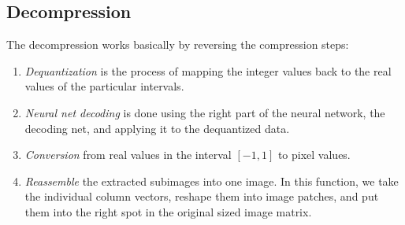 \subsection{Decompression} \label{sec:decompression}
The decompression works basically by reversing the compression steps:
\begin{enumerate}
\item \emph{Dequantization} is the process of mapping the integer values back to the real values of the particular intervals. 

\item \emph{Neural net decoding} is done using the right part of the neural network, the decoding net, and applying it to the dequantized data.

\item \emph{Conversion} from real values in the interval \([-1, 1]\) to pixel values.

\item \emph{Reassemble} the extracted subimages into one image. In this function, we take the individual column vectors, reshape them into image patches, and put them into the right spot in the original sized image matrix. 
\end{enumerate}

